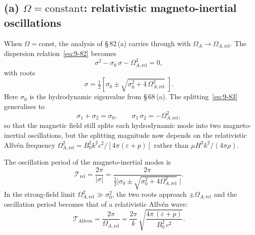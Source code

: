 \subsection*{(a) $\Omega = \mathrm{constant}$: relativistic
  magneto-inertial oscillations}
\label{sec:rel-82a}

When $\Omega = \text{const}$, the analysis of \S\,82\,(a) carries
through with $\Omega_{A}\to\Omega_{A,\mathrm{rel}}$.  The dispersion
relation~\eqref{eq:9-82} becomes
\begin{equation}
  \sigma^{2} - \sigma_{0}\,\sigma - \Omega_{A,\mathrm{rel}}^{2} = 0,
  \label{eq:rel-9-82}
\end{equation}
with roots
\begin{equation}
  \sigma = \tfrac{1}{2}\!\left[\sigma_{0}
    \pm \sqrt{\sigma_{0}^{2}
    + 4\,\Omega_{A,\mathrm{rel}}^{2}}\;\right].
  \label{eq:rel-9-84}
\end{equation}
Here $\sigma_{0}$ is the hydrodynamic eigenvalue from \S\,68\,(a).  The
splitting~\eqref{eq:9-83} generalises to
\begin{equation}
  \sigma_{1} + \sigma_{2} = \sigma_{0},
  \qquad
  \sigma_{1}\,\sigma_{2} = -\Omega_{A,\mathrm{rel}}^{2},
  \label{eq:rel-9-83}
\end{equation}
so that the magnetic field still splits each hydrodynamic mode into two
magneto-inertial oscillations, but the splitting magnitude now depends
on the relativistic Alfv\'en frequency
$\Omega_{A,\mathrm{rel}}^{2} = B_{0}^{2}k^{2}c^{2}/[4\pi(\varepsilon+p)]$
rather than $\mu H^{2}k^{2}/(4\pi\rho)$.

The oscillation period of the magneto-inertial modes is
\begin{equation}
  \mathcal{T}_{\mathrm{rel}}
  = \frac{2\pi}{|\sigma|}
  = \frac{2\pi}{\tfrac{1}{2}\bigl|\sigma_{0}
    \pm\sqrt{\sigma_{0}^{2}
    + 4\Omega_{A,\mathrm{rel}}^{2}}\;\bigr|}.
  \label{eq:rel-9-period}
\end{equation}
In the strong-field limit
$\Omega_{A,\mathrm{rel}}^{2} \gg \sigma_{0}^{2}$, the two roots
approach $\pm\Omega_{A,\mathrm{rel}}$ and the oscillation period
becomes that of a relativistic Alfv\'en wave:
\begin{equation}
  \mathcal{T}_{\mathrm{Alfven}}
  = \frac{2\pi}{\Omega_{A,\mathrm{rel}}}
  = \frac{2\pi}{k}\,
    \sqrt{\frac{4\pi\,(\varepsilon + p)}{B_{0}^{2}\,c^{2}}}.
  \label{eq:rel-9-TAlfven}
\end{equation}

